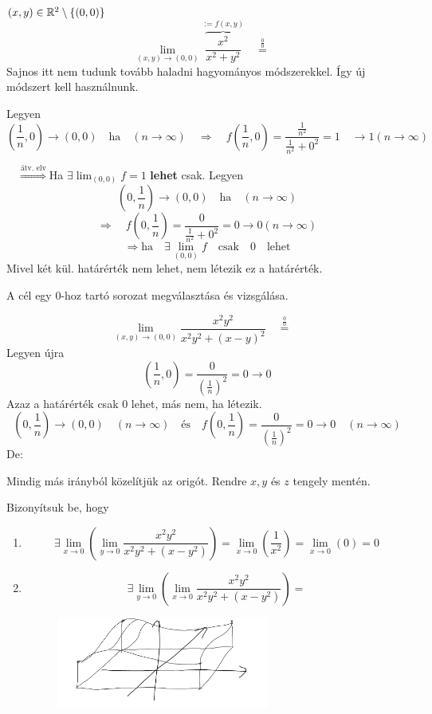 \documentclass[a4paper,11.5pt]{article}
\begin{document}
	\begin{task}$(x,y)\in\mathbb{R}^2\setminus\{(0,0)\}$
		\[ \lim_{(x,y)\to(0,0)}\overbrace{\frac{x^2}{x^2+y^2}}^{:=f(x,y)}\quad \overset{\frac{0}{0}}{=}\quad  \]
		Sajnos itt nem tudunk tovább haladni hagyományos módszerekkel. Így új módszert kell használnunk.
		\smallskip
		
		Legyen \[\left(\frac{1}{n},0\right)\to(0,0)\quad \text{ha}\quad (n\to\infty)\quad \Rightarrow\quad f\left(\frac{1}{n},0\right)=\frac{\frac{1}{n^2}}{\frac{1}{n^2}+0^2}=1\quad \to1(n\to\infty)\]
		
		$\quad \overset{\text{átv. elv}}{\Rightarrow}$\quad Ha $\exists\lim_{(0,0)}f=1$ \textbf{lehet} csak.
		Legyen 
		\[ \left(0,\frac{1}{n}\right)\to(0,0)\quad \text{ha}\quad (n\to\infty) \]
		\[ \Rightarrow\quad f\left(0,\frac{1}{n}\right)=\frac{0}{\frac{1}{n^2}+0^2}=0\to 0(n\to\infty) \]
		\[ \Rightarrow \text{ha}\quad \exists\lim_{(0,0)}f\quad \text{csak}\quad 0 \quad \text{lehet} \]
		Mivel két kül. határérték nem lehet, nem létezik ez a határérték.
	\end{task}
	\begin{note}
		A cél egy 0-hoz tartó sorozat megválasztása és vizsgálása.
	\end{note}
	\begin{task}
		\[ \lim_{(x,y)\to(0,0)}\frac{x^2y^2}{x^2y^2+(x-y)^2}\quad \overset{\frac{0}{0}}{=}\quad  \]
		Legyen újra
		\[ \left(\frac{1}{n},0\right)=\frac{0}{\left(\frac{1}{n}\right)^2}=0\to0 \]
		Azaz a határérték csak 0 lehet, más nem, ha létezik.
		\[ \left(0,\frac{1}{n}\right)\to(0,0)\quad (n\to\infty)\quad \text{és}\quad  f\left(0,\frac{1}{n}\right)=\frac{0}{\left(\frac{1}{n}\right)^2}=0\to 0\quad (n\to\infty) \]
		De:
	\end{task}
	\begin{note}
		Mindig más irányból közelítjük az origót. Rendre $x, y$ és $z$ tengely mentén.
	\end{note}
	\begin{task}
		Bizonyítsuk be, hogy
		\begin{enumerate}
			\item \[ \exists\lim_{x\to0}\left(\lim_{y\to0}\frac{x^2y^2}{x^2y^2+(x-y^2)}\right)=\lim_{x\to0}\left(\frac{1}{x^2}\right)=\lim_{x\to0}(0)=0 \]
			\item \[ \exists\lim_{y\to0}\left(\lim_{x\to0}\frac{x^2y^2}{x^2y^2+(x-y^2)}\right)= \]
			\begin{figure}[H]
				\centering
				\includegraphics[height=3cm]{kepek/07.png}
				\caption{}
			\end{figure}
		\end{enumerate}
	\end{task}
\end{document}
